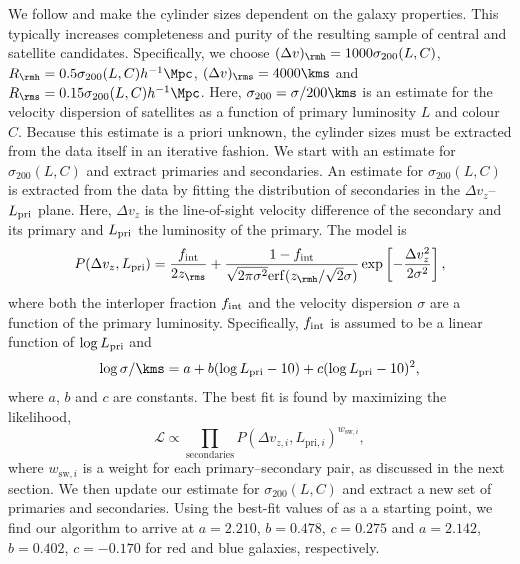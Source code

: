 \documentclass[fleqn,usenatbib,useAMS]{mnras}
\begin{document}
We follow \cite{vdBosch+04} and make the cylinder sizes dependent on the galaxy properties. This typically increases completeness and purity of the resulting sample of central and satellite candidates. Specifically, we choose $(\Delta v)_\rmh = 1000 \sigma_{200} (L, C)$, $R_\rmh = 0.5 \sigma_{200} (L, C) h^{-1} \Mpc$, $(\Delta v)_\rms = 4000 \kms$ and $R_\rms = 0.15 \sigma_{200} (L, C) h^{-1} \Mpc$. Here, $\sigma_{200} = \sigma / 200 \kms$ is an estimate for the velocity dispersion of satellites as a function of primary luminosity $L$ and colour $C$. Because this estimate is a priori unknown, the cylinder sizes must be extracted from the data itself in an iterative fashion. We start with an estimate for $\sigma_{200} (L, C)$ and extract primaries and secondaries. An estimate for $\sigma_{200} (L, C)$ is extracted from the data by fitting the distribution of secondaries in the $\Delta v_z$--$L_{\rm pri}$ plane. Here, $\Delta v_z$ is the line-of-sight velocity difference of the secondary and its primary and $L_{\rm pri}$ the luminosity of the primary. The model is
\begin{equation}
	P(\Delta v_z, L_{\rm pri}) = \frac{f_{\rm int}}{2 z_\rms} + \frac{1 - f_{\rm int}}{\sqrt{2 \pi \sigma^2} \mathrm{erf}(z_\rmh / \sqrt{2} \sigma)} \exp \left[ - \frac{\Delta v_z^2}{2 \sigma^2} \right],
\end{equation}
where both the interloper fraction $f_{\rm int}$ and the velocity dispersion $\sigma$ are a function of the primary luminosity. Specifically, $f_{\rm int}$ is assumed to be a linear function of $\log L_{\rm pri}$ and
\begin{equation}
	\log \sigma / \kms = a + b (\log L_{\rm pri} - 10) + c (\log L_{\rm pri} - 10)^2,
\end{equation}
where $a$, $b$ and $c$ are constants. The best fit is found by maximizing the likelihood,
\begin{equation}
	\mathcal{L} \propto \prod\limits_{\mathrm{secondaries}} P(\Delta v_{z, i}, L_{\mathrm{pri}, i})^{w_{\mathrm{sw}, i}},
	\label{eq:likelihood_mem}
\end{equation}
where $w_{\mathrm{sw}, i}$ is a weight for each primary--secondary pair, as discussed in the next section. We then update our estimate for $\sigma_{200} (L, C)$ and extract a new set of primaries and secondaries. Using the best-fit values of \cite{More+11} as a a starting point, we find our algorithm to arrive at $a = 2.210$, $b = 0.478$, $c = 0.275$ and $a = 2.142$, $b = 0.402$, $c = -0.170$ for red and blue galaxies, respectively.
\end{document}
